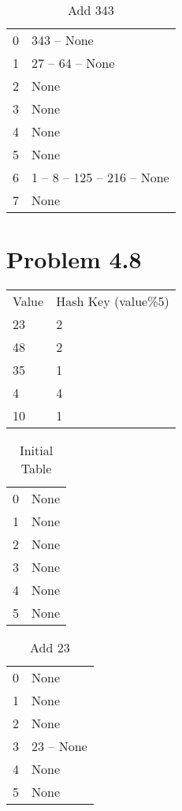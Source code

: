 \documentclass{article}
\begin{document}
		\begin{table}[]
			\centering
			\caption{Add 343}
			\begin{tabular}{ll}
				0& 343 -- None\\
				1& 27 -- 64 -- None\\
				2& None\\
				3& None\\
				4& None\\
				5& None\\
				6& 1 -- 8 -- 125 -- 216 -- None\\
				7& None\\
			\end{tabular}
		\end{table}
		
		
		
		
		\section*{Problem 4.8}
		\begin{tabular}{ll}
			Value&Hash Key (value\%5)\\
			23&2\\
			48&2\\
			35&1\\
			4&4\\
			10&1\\
		\end{tabular}
		\begin{table}[H]
			\centering
			\caption{Initial Table}
			\begin{tabular}{ll}
				0& None\\
				1& None\\
				2&None \\
				3& None\\
				4& None\\
				5& None\\
			\end{tabular}
		\end{table}
		
		\begin{table}[H]
			\centering
			\caption{Add 23}
			\begin{tabular}{ll}
				0& None\\
				1& None\\
				2& None \\
				3& 23 -- None\\
				4& None\\
				5& None\\
			\end{tabular}
		\end{table}
		
\end{document}
